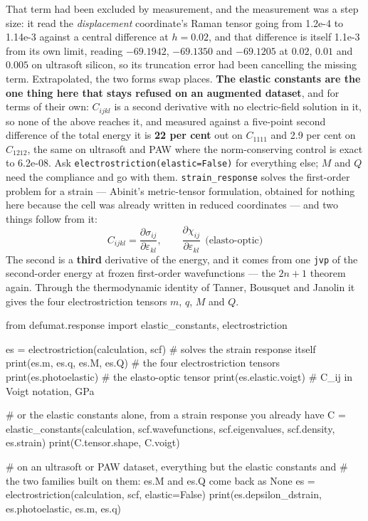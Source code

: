 \documentclass[11pt,a4paper]{article}
\newcommand{\code}[1]{\texttt{\small #1}}
\begin{document}
That term had been excluded by measurement, and the measurement was a step
size: it read the \emph{displacement} coordinate's Raman tensor going from
1.2e-4 to 1.14e-3 against a central difference at $h = 0.02$, and that
difference is itself 1.1e-3 from its own limit, reading $-69.1942$, $-69.1350$
and $-69.1205$ at $0.02$, $0.01$ and $0.005$ on ultrasoft silicon, so its
truncation error had been cancelling the missing term. Extrapolated, the
two forms swap places. \textbf{The elastic constants are the one thing here
that stays refused on an augmented dataset}, and for terms of their own:
$C_{ijkl}$ is a second derivative with no electric-field solution in it, so
none of the above reaches it, and measured against a five-point second
difference of the total energy it is \textbf{22 per cent} out on $C_{1111}$ and
2.9 per cent on $C_{1212}$, the same on ultrasoft and PAW where the
norm-conserving control is exact to 6.2e-08. Ask
\code{electrostriction(elastic=False)} for everything else; $M$ and $Q$ need
the compliance and go with them.
\code{strain\_response} solves the first-order problem for a strain --- Abinit's
metric-tensor formulation, obtained for nothing here because the cell was
already written in reduced coordinates --- and two things follow from it:
\begin{equation*}
C_{ijkl} = \frac{\partial\sigma_{ij}}{\partial\varepsilon_{kl}},
\qquad
\frac{\partial\chi_{ij}}{\partial\varepsilon_{kl}}\ \ \text{(elasto-optic)}
\end{equation*}
The second is a \textbf{third} derivative of the energy, and it comes from one
\code{jvp} of the second-order energy at frozen first-order wavefunctions ---
the $2n{+}1$ theorem again. Through the thermodynamic identity of Tanner,
Bousquet and Janolin it gives the four electrostriction tensors $m$, $q$, $M$
and $Q$.

\begin{pycode}
from defumat.response import elastic_constants, electrostriction

es = electrostriction(calculation, scf)     # solves the strain response itself
print(es.m, es.q, es.M, es.Q)              # the four electrostriction tensors
print(es.photoelastic)                      # the elasto-optic tensor
print(es.elastic.voigt)                     # C_ij in Voigt notation, GPa

# or the elastic constants alone, from a strain response you already have
C = elastic_constants(calculation, scf.wavefunctions, scf.eigenvalues,
                      scf.density, es.strain)
print(C.tensor.shape, C.voigt)

# on an ultrasoft or PAW dataset, everything but the elastic constants and
# the two families built on them: es.M and es.Q come back as None
es = electrostriction(calculation, scf, elastic=False)
print(es.depsilon_dstrain, es.photoelastic, es.m, es.q)
\end{pycode}
\end{document}
